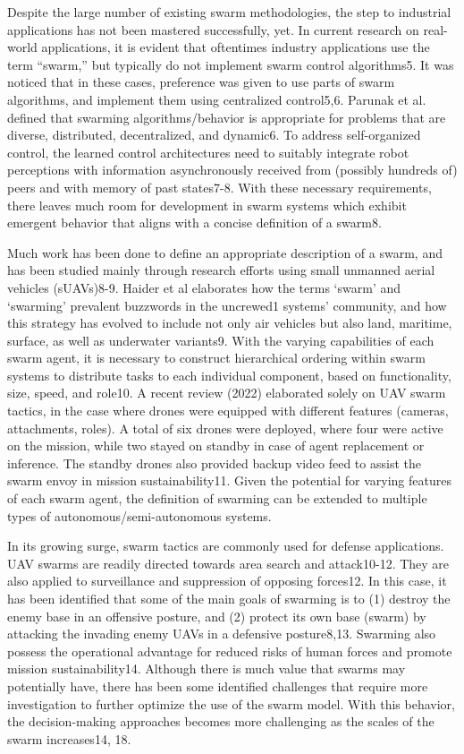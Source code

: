 Despite the large number of existing swarm methodologies, the step to industrial applications has not been mastered successfully, yet. In current research on real-world applications, it is evident that oftentimes industry applications use the term “swarm,” but typically do not implement swarm control algorithms5. It was noticed that in these cases, preference was given to use parts of swarm algorithms, and implement them using centralized control5,6. Parunak et al. defined that swarming algorithms/behavior is appropriate for problems that are diverse, distributed, decentralized, and dynamic6. To address self-organized control, the learned control architectures need to suitably integrate robot perceptions with information asynchronously received from (possibly hundreds of) peers and with memory of past states7-8. With these necessary requirements, there leaves much room for development in swarm systems which exhibit emergent behavior that aligns with a concise definition of a swarm8.

Much work has been done to define an appropriate description of a swarm, and has been studied mainly through research efforts using small unmanned aerial vehicles (sUAVs)8-9. Haider et al elaborates how the terms ‘swarm’ and ‘swarming’ prevalent buzzwords in the uncrewed1 systems’ community, and how this strategy has evolved to include not only air vehicles but also land, maritime, surface, as well as underwater variants9. With the varying capabilities of each swarm agent, it is necessary to construct hierarchical ordering within swarm systems to distribute tasks to each individual component, based on functionality, size, speed, and role10. A recent review (2022) elaborated solely on UAV swarm tactics, in the case where drones were equipped with different features (cameras, attachments, roles). A total of six drones were deployed, where four were active on the mission, while two stayed on standby in case of agent replacement or inference. The standby drones also provided backup video feed to assist the swarm envoy in mission sustainability11. Given the potential for varying features of each swarm agent, the definition of swarming can be extended to multiple types of autonomous/semi-autonomous systems.

In its growing surge, swarm tactics are commonly used for defense applications. UAV swarms are readily directed towards area search and attack10-12. They are also applied to surveillance and suppression of opposing forces12. In this case, it has been identified that some of the main goals of swarming is to (1) destroy the enemy base in an offensive posture, and (2) protect its own base (swarm) by attacking the invading enemy UAVs in a defensive posture8,13. Swarming also possess the operational advantage for reduced risks of human forces and promote mission sustainability14. Although there is much value that swarms may potentially have, there has been some identified challenges that require more investigation to further optimize the use of the swarm model. With this behavior, the decision-making approaches becomes more challenging as the scales of the swarm increases14, 18.

